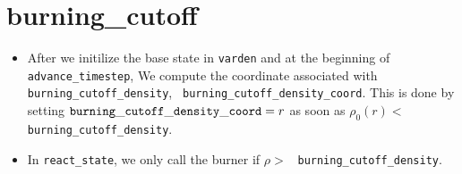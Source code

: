 \section{burning\_cutoff}

\begin{itemize}
\item After we initilize the base state in {\tt varden} and at the
  beginning of {\tt advance\_timestep}, We compute the coordinate
  associated with {\tt burning\_cutoff\_density}, {\tt
    burning\_cutoff\_density\_coord}.  This is done by setting ${\tt
    burning\_cutoff\_density\_coord}= r$ as soon as $\rho_0(r) <$ {\tt
    burning\_cutoff\_density}.

\item In {\tt react\_state}, we only call the burner if $\rho >$ {\tt
  burning\_cutoff\_density}.
\end{itemize}

